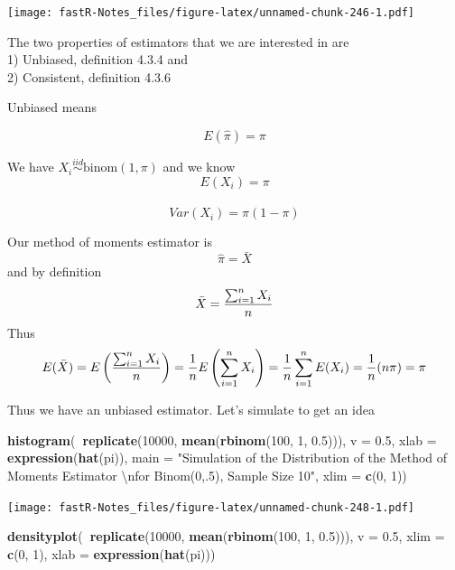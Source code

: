 \documentclass[]{book}
\newenvironment{Shaded}{\begin{snugshade}}{\end{snugshade}}
\newcommand{\KeywordTok}[1]{\textcolor[rgb]{0.13,0.29,0.53}{\textbf{#1}}}
\newcommand{\DataTypeTok}[1]{\textcolor[rgb]{0.13,0.29,0.53}{#1}}
\newcommand{\DecValTok}[1]{\textcolor[rgb]{0.00,0.00,0.81}{#1}}
\newcommand{\FloatTok}[1]{\textcolor[rgb]{0.00,0.00,0.81}{#1}}
\newcommand{\CharTok}[1]{\textcolor[rgb]{0.31,0.60,0.02}{#1}}
\newcommand{\StringTok}[1]{\textcolor[rgb]{0.31,0.60,0.02}{#1}}
\newcommand{\OperatorTok}[1]{\textcolor[rgb]{0.81,0.36,0.00}{\textbf{#1}}}
\newcommand{\NormalTok}[1]{#1}
\theoremstyle{definition}
\theoremstyle{definition}
\theoremstyle{definition}
\theoremstyle{remark}
\begin{document}
\texttt{[image: fastR-Notes\_files/figure-latex/unnamed-chunk-246-1.pdf]}

The two properties of estimators that we are interested in are\\
1) Unbiased, definition 4.3.4 and\\
2) Consistent, definition 4.3.6

Unbiased means

\[E(\hat{\pi})=\pi\]

We have \(X_{i} \overset{iid}{\sim} \mbox{binom} (1,\pi)\) and we know
\[E(X_{i})=\pi\]\\
\[Var(X_{i})=\pi(1-\pi)\]

Our method of moments estimator is \[\hat{\pi}=\bar{X}\] and by
definition\\
\[\bar{X}={\sum_{i=1}^{n}X_{i} \over n}\] Thus
\[E(\bar{X})=E \left( {\sum_{i=1}^{n}X_{i} \over n}\right)={1 \over n} E \left( \sum_{i=1}^{n}X_{i}\right)={1 \over n}\sum_{i=1}^{n}E(X_{i})={1 \over n}(n\pi)=\pi\]

Thus we have an unbiased estimator. Let's simulate to get an idea

\begin{Shaded}
\begin{Highlighting}[]
\KeywordTok{histogram}\NormalTok{(}\OperatorTok{~}\KeywordTok{replicate}\NormalTok{(}\DecValTok{10000}\NormalTok{, }\KeywordTok{mean}\NormalTok{(}\KeywordTok{rbinom}\NormalTok{(}\DecValTok{100}\NormalTok{, }\DecValTok{1}\NormalTok{, }\FloatTok{0.5}\NormalTok{))), }\DataTypeTok{v =} \FloatTok{0.5}\NormalTok{, }\DataTypeTok{xlab =} \KeywordTok{expression}\NormalTok{(}\KeywordTok{hat}\NormalTok{(pi)), }
    \DataTypeTok{main =} \StringTok{"Simulation of the Distribution of the Method of Moments Estimator }\CharTok{\textbackslash{}n}\StringTok{for Binom(0,.5), Sample Size 10"}\NormalTok{, }
    \DataTypeTok{xlim =} \KeywordTok{c}\NormalTok{(}\DecValTok{0}\NormalTok{, }\DecValTok{1}\NormalTok{))}
\end{Highlighting}
\end{Shaded}

\texttt{[image: fastR-Notes\_files/figure-latex/unnamed-chunk-248-1.pdf]}

\begin{Shaded}
\begin{Highlighting}[]
\KeywordTok{densityplot}\NormalTok{(}\OperatorTok{~}\KeywordTok{replicate}\NormalTok{(}\DecValTok{10000}\NormalTok{, }\KeywordTok{mean}\NormalTok{(}\KeywordTok{rbinom}\NormalTok{(}\DecValTok{100}\NormalTok{, }\DecValTok{1}\NormalTok{, }\FloatTok{0.5}\NormalTok{))), }\DataTypeTok{v =} \FloatTok{0.5}\NormalTok{, }\DataTypeTok{xlim =} \KeywordTok{c}\NormalTok{(}\DecValTok{0}\NormalTok{, }
    \DecValTok{1}\NormalTok{), }\DataTypeTok{xlab =} \KeywordTok{expression}\NormalTok{(}\KeywordTok{hat}\NormalTok{(pi)))}
\end{Highlighting}
\end{Shaded}
\end{document}
